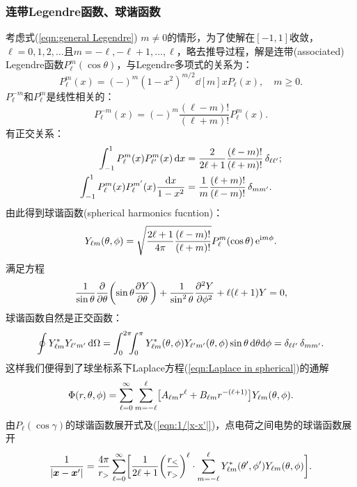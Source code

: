 \subsubsection{连带Legendre函数、球谐函数}
考虑式(\ref{eqn:general Legendre}) $m\neq 0$的情形，为了使解在$[-1,1]$收敛，$\ell=0,1,2,\ldots$且$m=-\ell,-\ell+1,\ldots,\ell$，略去推导过程，解是连带(associated) Legendre函数$P_\ell^m(\cos\theta)$，与Legendre多项式的关系为： 
\[
    P_\ell^m(x)=(-)^m(1-x^2)^{m/2}\dd[m]xP_\ell(x),\quad m\geqslant 0.
\]
$P_\ell^{-m}$和$P_\ell^m$是线性相关的：
\[
    P_\ell^{-m}(x)=(-)^m\frac{(\ell-m)!}{(\ell+m)!}P_\ell^m(x).
\]
有正交关系：
\begin{align*}
    \int_{-1}^1P_\ell^m(x)P_{\ell'}^m(x)\d x&=\frac2{2\ell+1}\frac{(\ell-m)!}{(\ell+m)!}\vd_{\ell\ell'};\\
    \int_{-1}^1P_\ell^m(x)P_\ell^{m'}(x)\frac{\d x}{1-x^2}&=\frac1m\frac{(\ell+m)!}{(\ell-m)!}\vd_{mm'}.
\end{align*}
由此得到球谐函数(spherical harmonics fucntion)：
\begin{equation}
    Y_{\ell m}(\theta,\phi)=\sqrt{\frac{2\ell+1}{4\pi}\frac{(\ell-m)!}{(\ell+m)!}}P_\ell^m(\cos\theta)\e{\i m\phi}.
\end{equation}
满足方程
\[
    \frac1{\sin\theta}\pp\theta\biggkh{\sin\theta\pv Y\theta}+\frac1{\sin^2\theta}\pv[2]Y\phi+\ell(\ell+1)Y=0,
\]
球谐函数自然是正交函数：
\[
    \oint Y_{\ell m}^\ast Y_{\ell'm'}\d\Omega=\int_0^{2\pi}\bs5\int_0^\pi Y_{\ell m}^\ast(\theta,\phi) Y_{\ell'm'}(\theta,\phi)\sin\theta\d\theta\nd\phi=\delta_{\ell\ell'}\vd_{mm'}.
\]
这样我们便得到了球坐标系下Laplace方程(\ref{eqn:Laplace in spherical})的通解
\begin{equation}
    \Phi(r,\theta,\phi)=\sum\fmto{\ell}0\sum_{m=-\ell}^\ell\bigfkh{A_{\ell m}r^\ell+B_{\ell m}r^{-(\ell+1)}}Y_{\ell m}(\theta,\phi).
\end{equation}
由$P_\ell(\cos\gamma)$的球谐函数展开式及(\ref{eqn:1/|x-x'|})，点电荷之间电势的球谐函数展开
\begin{equation}
    \label{eqn:1/|x-x'|=YY}
    \frac1{|\bm x-\bm x'|}=\frac{4\pi}{r_>}\sum\fmto{\ell}0\biggfkh{\frac1{2\ell+1}\biggkh{\frac{r_<}{r_>}}^\ell\cdot\sum_{m=-\ell}^\ell Y^\ast_{\ell m}(\theta',\phi')Y_{\ell m}(\theta,\phi)}.
\end{equation}
